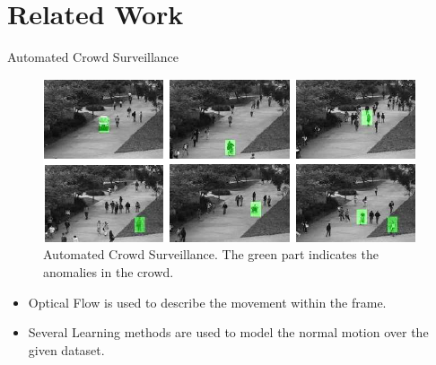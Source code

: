 \documentclass{beamer}
\begin{document}
\section{Related Work}

\begin{frame}{Automated Crowd Surveillance}
     \begin{figure}[h]
     	\centering
     	\includegraphics[scale= 0.5]{images/anom_green.png} 
     	\caption{Automated Crowd Surveillance. The green part indicates the anomalies in the crowd. \cite{ucsd_anom}}
     \end{figure}

\begin{itemize}
\item Optical Flow is used to describe the movement within the frame.
\item Several Learning methods are used to model the normal motion over the given dataset.
\end{itemize}

\end{frame}
\end{document}
